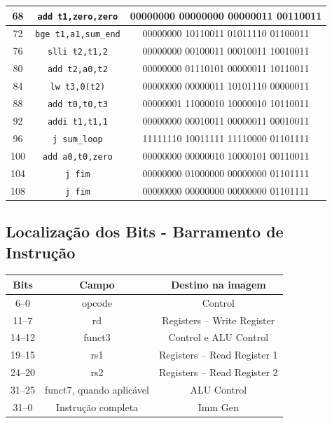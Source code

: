 \documentclass[12pt,a4paper,titlepage]{article}
\begin{document}
\begin{table}[h]
\begin{tabular}{|c|c|c|}
        68 & \texttt{add t1,zero,zero} & 00000000 00000000 00000011 00110011 \\ \hline
        72 & \texttt{bge t1,a1,sum\_end} & 00000000 10110011 01011110 01100011 \\ \hline
        76 & \texttt{slli t2,t1,2} & 00000000 00100011 00010011 10010011 \\ \hline
        80 & \texttt{add t2,a0,t2} & 00000000 01110101 00000011 10110011 \\ \hline
        84 & \texttt{lw t3,0(t2)} & 00000000 00000011 10101110 00000011 \\ \hline
        88 & \texttt{add t0,t0,t3} & 00000001 11000010 10000010 10110011 \\ \hline
        92 & \texttt{addi t1,t1,1} & 00000000 00010011 00000011 00010011 \\ \hline
        96 & \texttt{j sum\_loop} & 11111110 10011111 11110000 01101111 \\ \hline
        100 & \texttt{add a0,t0,zero} & 00000000 00000010 10000101 00110011 \\ \hline
        104 & \texttt{j fim} & 00000000 01000000 00000000 01101111 \\ \hline
        108 & \texttt{j fim} & 00000000 00000000 00000000 01101111 \\ \hline
    \end{tabular}
\end{table}

\clearpage\subsection{Localização dos Bits - Barramento de Instrução}
\begin{table}[h]
    \centering
    \begin{tabular}{|c|c|c|}
        \hline
        \textbf{Bits} & \textbf{Campo} & \textbf{Destino na imagem} \\ \hline\hline
        6--0 & opcode & Control \\ \hline
        11--7 & rd & Registers -- Write Register \\ \hline
        14--12 & funct3 & Control e ALU Control \\ \hline
        19--15 & rs1 & Registers -- Read Register 1 \\ \hline
        24--20 & rs2 & Registers -- Read Register 2 \\ \hline
        31--25 & funct7, quando aplicável & ALU Control \\ \hline
        31--0 & Instrução completa & Imm Gen \\ \hline
    \end{tabular}
\end{table}
\end{document}
